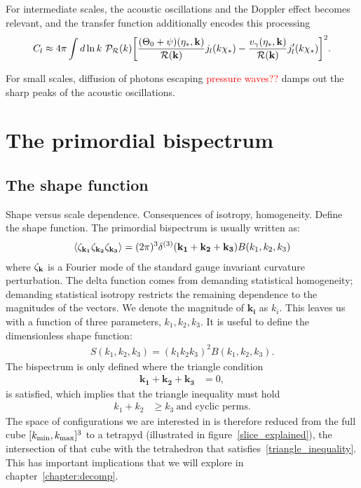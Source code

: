     For intermediate scales, the acoustic oscillations and the Doppler effect
    becomes relevant, and the transfer function additionally encodes this processing
    \begin{align}
        C_l \approx 4\pi\int d\ln k~\mathcal{P}_{\mathcal{R}}(k){\left[
            \frac{(\Theta_0+\psi)(\eta_*,\mathbf{k})}{\mathcal{R}(\mathbf{k})}j_l(k\chi_*)
            -\frac{v_\gamma(\eta_*,\mathbf{k})}{\mathcal{R}(\mathbf{k})}j'_l(k\chi_*)
            \right]}^2.
    \end{align}


    For small scales, diffusion of photons escaping \textcolor{red}{pressure waves??}
    damps out the sharp peaks of the acoustic oscillations.


\section{The primordial bispectrum}
    \subsection{The shape function}
    Shape versus scale dependence.
    Consequences of isotropy, homogeneity.
    Define the shape function.
The primordial bispectrum is usually written as:
\begin{align}\label{bispectrum_definition}
{
\left< \zeta_{\bf{k_1}}\zeta_{\bf{k_2}}\zeta_{\bf{k_3}} \right>
= (2\pi)^3\delta^{(3)}(\mathbf{k_1}+\mathbf{k_2}+\mathbf{k_3})B(k_1,k_2,k_3)
}
\end{align}
where $\zeta_{\bf{k}}$ is a Fourier mode of the standard gauge invariant curvature perturbation.
The delta function comes from demanding statistical homogeneity;
demanding statistical isotropy restricts the remaining dependence to the magnitudes of the vectors.
We denote the magnitude of $\mathbf{k_i}$ as $k_i$.
This leaves us with a function of three parameters,
$k_1,k_2,k_3$.
It is useful to define the dimensionless shape function:
\begin{align}\label{shapefn}
{
    S(k_1,k_2,k_3) = (k_1k_2k_3)^2B(k_1,k_2,k_3).
}
\end{align}
The bispectrum is only defined where the triangle condition
\begin{align}\label{triangle_condition}
    \mathbf{k_1}+\mathbf{k_2}+\mathbf{k_3} &= 0,
\end{align}
is satisfied, which implies that the triangle inequality must hold
\begin{align}\label{triangle_inequality}
    k_1+k_2 &\geq k_3~\text{and cyclic perms}.
\end{align}
The space of configurations we are interested in is therefore
reduced from the full cube $[{k_\text{min}},{k_\text{max}}]^3$
to a tetrapyd (illustrated in figure~\ref{slice_explained}),
the intersection of that cube with the
tetrahedron that satisfies~\eqref{triangle_inequality}.
This has important implications that we will explore in
chapter~\ref{chapter:decomp}. 


